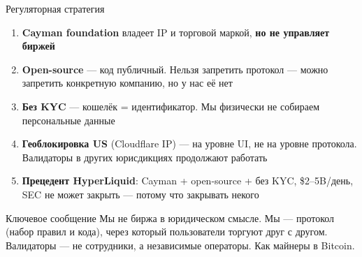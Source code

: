 \documentclass[aspectratio=169]{beamer}
\begin{document}
\begin{frame}{Регуляторная стратегия}

\begin{enumerate}
    \item \textbf{Cayman foundation} владеет IP и торговой маркой, \textbf{но не управляет биржей}
    \item \textbf{Open-source} --- код публичный. Нельзя запретить протокол --- можно запретить конкретную компанию, но у нас её нет
    \item \textbf{Без KYC} --- кошелёк = идентификатор. Мы физически не собираем персональные данные
    \item \textbf{Геоблокировка US} (Cloudflare IP) --- на уровне UI, не на уровне протокола. Валидаторы в других юрисдикциях продолжают работать
    \item \textbf{Прецедент HyperLiquid}: Cayman + open-source + без KYC, \$2--5B/день, SEC не может закрыть --- потому что закрывать некого
\end{enumerate}

\vspace{0.5em}
\begin{block}{Ключевое сообщение}
Мы не биржа в юридическом смысле. Мы --- протокол (набор правил и кода),
через который пользователи торгуют друг с другом. Валидаторы --- не сотрудники,
а независимые операторы. Как майнеры в Bitcoin.
\end{block}

\centering{\small \textcolor{orange}{Не является юридической консультацией. Требуется advice от crypto-юриста.}}
\end{frame}
\end{document}
